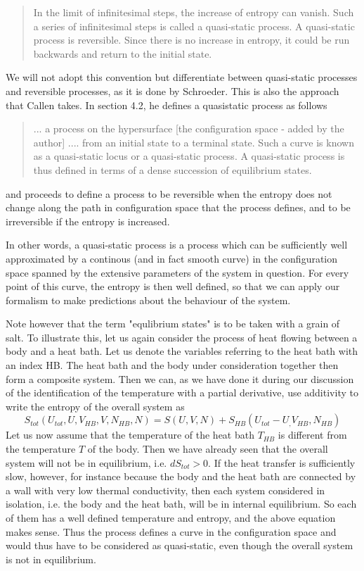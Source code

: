 \documentclass[a4paper, draft]{report}
\numberwithin{section}{chapter}
\numberwithin{equation}{chapter}
\theoremstyle{own}
\theoremstyle{remark}
\begin{document}
\begin{quote}
In the limit of infinitesimal steps, the increase of entropy can vanish. Such a series of infinitesimal steps is called a quasi-static process. A quasi-static process is reversible. Since there is no increase in entropy, it could be run backwards and return to the initial state.
\end{quote}

We will not adopt this convention but differentiate between quasi-static processes and reversible processes, as it is done by Schroeder. This is also the approach that Callen takes. In \cite{Callen} section 4.2, he defines a quasistatic process as follows 

\begin{quote}
... a process on the hypersurface [the configuration space - added by the author] .... from an initial state to a terminal state. Such a curve is known as a quasi-static locus or a quasi-static process. A quasi-static process is thus defined in terms of a dense succession of equilibrium states.
\end{quote}

and proceeds to define a process to be reversible when the entropy does not change along the path in configuration space that the process defines, and to be irreversible if the entropy is increased.

In other words, a quasi-static process is a process which can be sufficiently well approximated by a continous (and in fact smooth curve) in the configuration space spanned by the extensive parameters of the system in question. For every point of this curve, the entropy is then well defined, so that we can apply our formalism to make predictions about the behaviour of the system.

Note however that the term "equlibrium states" is to be taken with a grain of salt. To illustrate this, let us again consider the process of heat flowing between a body and a heat bath. Let us denote the variables referring to the heat bath with an index HB. The heat bath and the body under consideration together then form a composite system. Then we can, as we have done it during our discussion of the identification of the temperature with a partial derivative, use additivity to write the entropy of the overall system as
$$
S_{tot}(U_{tot}, U, V_{HB}, V, N_{HB}, N) = S(U, V, N) + S_{HB}(U_{tot} - U_, V_{HB}, N_{HB})
$$
Let us now assume that the temperature of the heat bath $T_{HB}$ is different from the temperature $T$ of the body. Then we have already seen that the overall system will not be in equilibrium, i.e. $dS_{tot} > 0$. If the heat transfer is sufficiently slow, however, for instance because the body and the heat bath are connected by a wall with very low thermal conductivity, then each system considered in isolation, i.e. the body and the heat bath, will be in internal equilibrium. So each of them has a well defined temperature and entropy, and the above equation makes sense. Thus the process defines a curve in the configuration space and would thus have to be considered as quasi-static, even though the overall system is not in equilibrium.
\end{document}
